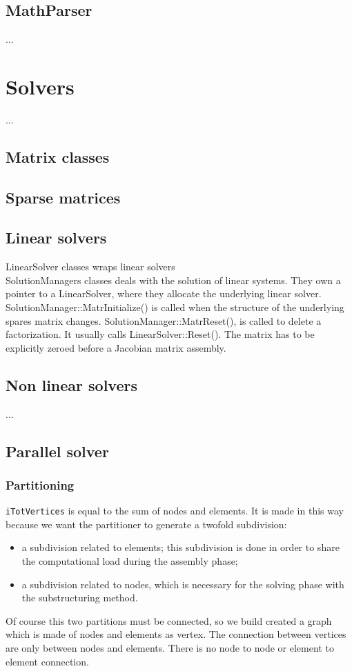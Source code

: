 \documentclass[10pt,dvips]{report}
\begin{document}
\section{MathParser} ...

\chapter{Solvers}
...
\section{Matrix classes}

\section{Sparse matrices}

\section{Linear solvers}
LinearSolver classes wraps linear solvers\\
SolutionManagers classes deals with the solution of linear systems.
They own a pointer to a LinearSolver, where they allocate
the underlying linear solver.
SolutionManager::MatrInitialize() is called
when the structure of the underlying spares matrix changes.
SolutionManager::MatrReset(), is called to delete a factorization.
It usually calls LinearSolver::Reset(). The matrix has to be explicitly
zeroed before a Jacobian matrix assembly.

\section{Non linear solvers}
...
\section{Parallel solver}
\subsection{Partitioning}
\texttt{iTotVertices} is equal to the sum of nodes and elements. 
It is made in this way because we want the partitioner 
to generate a twofold subdivision:
\begin{itemize}
\item a subdivision related to elements; 
this subdivision is done in order to share the computational 
load during the assembly phase;
\item a subdivision related to nodes, 
which is necessary for the solving phase with the substructuring method.
\end{itemize}
Of course this two partitions must be connected, 
so we build created a graph which is made of nodes and elements as vertex. 
The connection between vertices are only between nodes and elements. 
There is no node to node or element to element connection.
\end{document}
